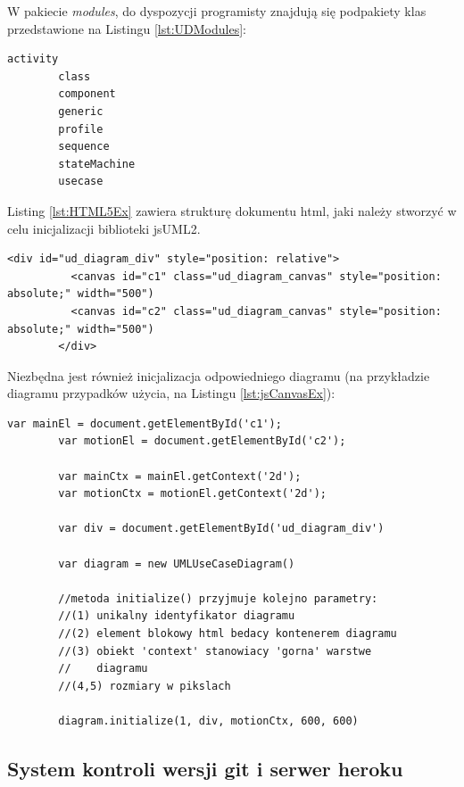         W pakiecie \emph{modules}, do dyspozycji programisty znajdują się podpakiety klas przedstawione na Listingu \ref{lst:UDModules}:

        \begin{lstlisting}[caption={Pakiety modułów jsUML2}, label={lst:UDModules}]
        activity
        class
        component
        generic
        profile
        sequence
        stateMachine
        usecase
        \end{lstlisting}

        Listing \ref{lst:HTML5Ex} zawiera strukturę dokumentu html, jaki należy stworzyć w celu inicjalizacji biblioteki jsUML2.

        \begin{lstlisting}[caption={HTML canvas element}, label={lst:HTML5Ex}]
        <div id="ud_diagram_div" style="position: relative">
          <canvas id="c1" class="ud_diagram_canvas" style="position: absolute;" width="500")
          <canvas id="c2" class="ud_diagram_canvas" style="position: absolute;" width="500")
        </div>
        \end{lstlisting}
      
        \newpage
      
        Niezbędna jest również inicjalizacja odpowiedniego diagramu (na przykładzie diagramu przypadków użycia, na Listingu \ref{lst:jsCanvasEx}):

        \begin{lstlisting}[caption={HTML canvas element - JS}, label={lst:jsCanvasEx}]
        var mainEl = document.getElementById('c1');
        var motionEl = document.getElementById('c2');

        var mainCtx = mainEl.getContext('2d');
        var motionCtx = motionEl.getContext('2d');

        var div = document.getElementById('ud_diagram_div')

        var diagram = new UMLUseCaseDiagram()

        //metoda initialize() przyjmuje kolejno parametry:
        //(1) unikalny identyfikator diagramu
        //(2) element blokowy html bedacy kontenerem diagramu
        //(3) obiekt 'context' stanowiacy 'gorna' warstwe
        //    diagramu
        //(4,5) rozmiary w pikslach 

        diagram.initialize(1, div, motionCtx, 600, 600) 
        \end{lstlisting}

\subsection{System kontroli wersji git i serwer heroku}
  
